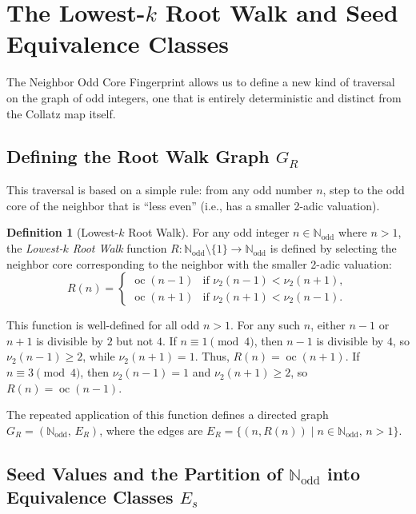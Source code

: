 \documentclass[12pt]{article}
\theoremstyle{plain}
\theoremstyle{definition}
\newtheorem{definition}[theorem]{Definition}
\begin{document}
\section{The Lowest-$k$ Root Walk and Seed Equivalence Classes}

The Neighbor Odd Core Fingerprint allows us to define a new kind of traversal on the graph of odd integers, one that is entirely deterministic and distinct from the Collatz map itself.

\subsection{Defining the Root Walk Graph $G_R$}

This traversal is based on a simple rule: from any odd number $n$, step to the odd core of the neighbor that is ``less even'' (i.e., has a smaller 2-adic valuation).

\begin{definition}[Lowest-$k$ Root Walk]
For any odd integer $n \in \mathbb{N}_{\text{odd}}$ where $n > 1$, the \emph{Lowest-$k$ Root Walk} function $R: \mathbb{N}_{\text{odd}} \setminus \{1\} \to \mathbb{N}_{\text{odd}}$ is defined by selecting the neighbor core corresponding to the neighbor with the smaller 2-adic valuation:
\[
R(n) =
\begin{cases}
\operatorname{oc}(n-1) & \text{if } \nu_2(n-1) < \nu_2(n+1), \\
\operatorname{oc}(n+1) & \text{if } \nu_2(n+1) < \nu_2(n-1).
\end{cases}
\]
\end{definition}

This function is well-defined for all odd $n > 1$. For any such $n$, either $n-1$ or $n+1$ is divisible by $2$ but not $4$. If $n \equiv 1 \pmod{4}$, then $n-1$ is divisible by $4$, so $\nu_2(n-1) \geq 2$, while $\nu_2(n+1) = 1$. Thus, $R(n) = \operatorname{oc}(n+1)$. If $n \equiv 3 \pmod{4}$, then $\nu_2(n-1) = 1$ and $\nu_2(n+1) \geq 2$, so $R(n) = \operatorname{oc}(n-1)$.

The repeated application of this function defines a directed graph $G_R = (\mathbb{N}_{\text{odd}},\, E_R)$, where the edges are $E_R = \{ (n, R(n)) \mid n \in \mathbb{N}_{\text{odd}},\, n > 1 \}$.

\subsection{Seed Values and the Partition of $\mathbb{N}_{\text{odd}}$ into Equivalence Classes $E_s$}
\end{document}
